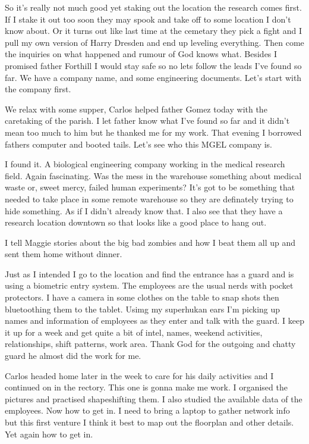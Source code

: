 So it's really not much good yet staking out the location the research comes first. If I stake it out too soon they may spook and take off to some location I don't know about. Or it turns out like last time at the cemetary they pick a fight and I pull my own version of Harry Dresden and end up leveling everything. Then come the inquiries on what happened and rumour of God knows what. Besides I promised father Forthill I would stay safe so no lets follow the leads I've found so far. We have a company name, and some engineering documents. Let's start with the company first.

We relax with some supper, Carlos helped father Gomez today with the caretaking of the parish. I let father know what I've found so far and it didn't mean too much to him but he thanked me for my work. That evening I borrowed fathers computer and booted tails. Let's see who this MGEL company is.

I found it. A biological engineering company working in the medical research field. Again fascinating. Was the mess in the warehouse something about medical waste or, sweet mercy, failed human experiments? It's got to be something that needed to take place in some remote warehouse so they are definately trying to hide something. As if I didn't already know that. I also see that they have a research location downtown so that looks like a good place to hang out.

I tell Maggie stories about the big bad zombies and how I beat them all up and sent them home without dinner.

Just as I intended I go to the location and find the entrance has a guard and is using a biometric entry system. The employees are the usual nerds with pocket protectors. I have a camera in some clothes on the table to snap shots then bluetoothing them to the tablet. Usimg my superhukan ears I'm picking up names and information of employees as they enter and talk with the guard. I keep it up for a week and get quite a bit of intel, names, weekend activities, relationships, shift patterns, work area. Thank God for the outgoing and chatty guard he almost did the work for me.

Carlos headed home  later in the week to care for his daily activities and I continued on in the rectory. This one is gonna make me work. I organised the pictures and practised shapeshifting them. I also studied the available data of the employees. Now how to get in. I need to bring a laptop to gather network info but this first venture I think it best to map out the floorplan and other details. Yet again how to get in.

